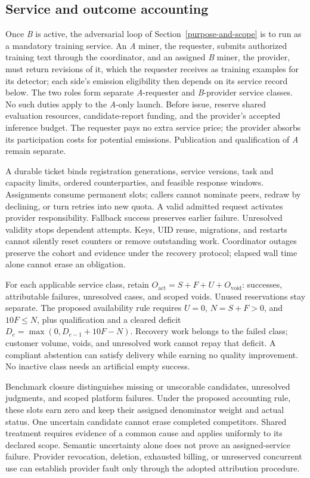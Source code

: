\subsection{Service and outcome accounting}\label{service-evidence}
\label{adversarial-feedback-loop}

Once \textit{B} is active, the adversarial loop of Section~\ref{purpose-and-scope}
is to run as a mandatory training service. An \textit{A} miner, the requester,
submits authorized training text through the coordinator, and an assigned
\textit{B} miner, the provider, must return revisions of it, which the requester
receives as training examples for its detector; each side's emission
eligibility then depends on its service record below. The two roles form
separate \textit{A}-requester and \textit{B}-provider service classes. No such
duties apply to the \textit{A}-only launch.
Before issue, reserve shared evaluation resources, candidate-report funding,
and the provider's accepted inference budget. The requester pays no extra
service price; the provider absorbs its participation costs for potential
emissions. Publication and qualification of \textit{A} remain separate.

A durable ticket binds registration generations, service versions, task and
capacity limits, ordered counterparties, and feasible response windows.
Assignments consume permanent slots; callers cannot nominate peers, redraw by
declining, or turn retries into new quota. A valid admitted request activates
provider responsibility. Fallback success preserves earlier failure.
Unresolved validity stops dependent attempts. Keys, UID reuse, migrations, and
restarts cannot silently reset counters or remove outstanding work.
Coordinator outages preserve the cohort and evidence under the recovery
protocol; elapsed wall time alone cannot erase an obligation.

For each applicable service class, retain
\(O_{\mathrm{act}}=S+F+U+O_{\mathrm{void}}\): successes, attributable failures,
unresolved cases, and scoped voids. Unused reservations stay separate. The
proposed availability rule requires \(U=0\), \(N=S+F>0\), and
\(10F\leq N\), plus qualification and a cleared deficit
\(D_e=\max(0,D_{e-1}+10F-N)\). Recovery work belongs to the failed class;
customer volume, voids, and unresolved work cannot repay that deficit. A
compliant abstention can satisfy delivery while earning no quality improvement.
No inactive class needs an artificial empty success.

Benchmark closure distinguishes missing or unscorable candidates, unresolved
judgments, and scoped platform failures. Under the proposed accounting rule, these
slots earn zero and keep their assigned denominator weight and actual status.
One uncertain candidate cannot erase completed competitors. Shared treatment
requires evidence of a common cause and applies uniformly to its declared
scope. Semantic uncertainty alone does not prove an assigned-service failure.
Provider revocation, deletion, exhausted billing, or unreserved concurrent use
can establish provider fault only through the adopted attribution procedure.

